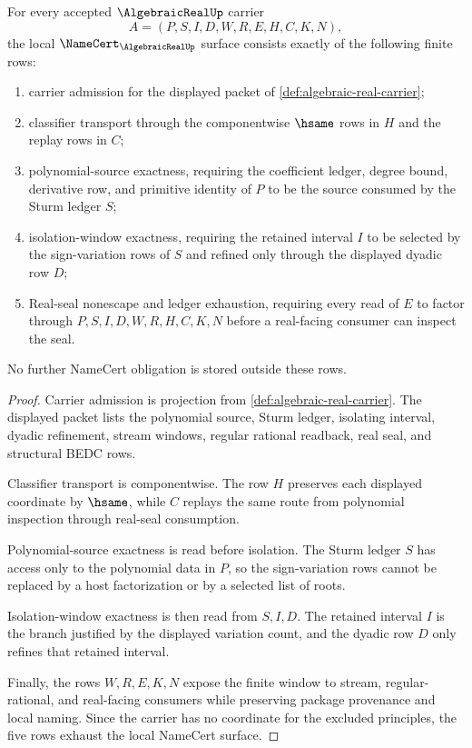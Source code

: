 \begin{theorem}
\label{thm:algebraic-real-namecert-obligations}
For every accepted $\AlgebraicRealUp$ carrier
$$
A=(P,S,I,D,W,R,E,H,C,K,N),
$$
the local $\NameCert_{\AlgebraicRealUp}$ surface consists exactly of the following finite rows:
\begin{enumerate}
\item carrier admission for the displayed packet of \autoref{def:algebraic-real-carrier};
\item classifier transport through the componentwise $\hsame$ rows in $H$ and the replay rows in $C$;
\item polynomial-source exactness, requiring the coefficient ledger, degree bound, derivative row, and primitive identity of $P$ to be the source consumed by the Sturm ledger $S$;
\item isolation-window exactness, requiring the retained interval $I$ to be selected by the sign-variation rows of $S$ and refined only through the displayed dyadic row $D$;
\item Real-seal nonescape and ledger exhaustion, requiring every read of $E$ to factor through $P,S,I,D,W,R,H,C,K,N$ before a real-facing consumer can inspect the seal.
\end{enumerate}
No further NameCert obligation is stored outside these rows.
\end{theorem}
\begin{proof}
Carrier admission is projection from \autoref{def:algebraic-real-carrier}. The displayed packet lists the polynomial source, Sturm ledger, isolating interval, dyadic refinement, stream windows, regular rational readback, real seal, and structural BEDC rows.

Classifier transport is componentwise. The row $H$ preserves each displayed coordinate by $\hsame$, while $C$ replays the same route from polynomial inspection through real-seal consumption.

Polynomial-source exactness is read before isolation. The Sturm ledger $S$ has access only to the polynomial data in $P$, so the sign-variation rows cannot be replaced by a host factorization or by a selected list of roots.

Isolation-window exactness is then read from $S,I,D$. The retained interval $I$ is the branch justified by the displayed variation count, and the dyadic row $D$ only refines that retained interval.

Finally, the rows $W,R,E,K,N$ expose the finite window to stream, regular-rational, and real-facing consumers while preserving package provenance and local naming. Since the carrier has no coordinate for the excluded principles, the five rows exhaust the local NameCert surface.
\end{proof}


